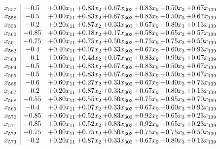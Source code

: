 \documentclass[8pt]{article}
\begin{document}
\[\begin{array}{c| c c@{\hskip 2pt} c@{\hskip 2pt} c@{\hskip 2pt} c@{\hskip 2pt} c@{\hskip 2pt} c@{\hskip 2pt} }
 x_{557}   &  -0.5 & +  0.00 x_{11} & +  0.83 x_{2} & +  0.67 x_{303} & +  0.83 x_{9} & +  0.50 x_{3} & +  0.67 x_{139}\\
 x_{558}   &  -0.5 & +  0.00 x_{11} & +  0.83 x_{2} & +  0.67 x_{303} & +  0.83 x_{9} & +  0.50 x_{3} & +  0.67 x_{139}\\
 x_{559}   &  -0.2 & +  0.20 x_{11} & +  0.87 x_{2} & +  0.33 x_{303} & +  0.67 x_{9} & +  0.80 x_{3} & +  0.13 x_{139}\\
 x_{560}   &  -0.85 & +  0.60 x_{11} & +  0.18 x_{2} & +  0.17 x_{303} & +  0.58 x_{9} & +  0.65 x_{3} & +  0.57 x_{139}\\
 x_{561}   &  -0.75 & +  0.00 x_{11} & +  0.75 x_{2} & +  0.50 x_{303} & +  0.75 x_{9} & +  0.75 x_{3} & +  0.50 x_{139}\\
 x_{562}   &  -0.4 & +  0.40 x_{11} & +  0.07 x_{2} & +  0.33 x_{303} & +  0.67 x_{9} & +  0.60 x_{3} & +  0.93 x_{139}\\
 x_{563}   &  -0.1 & +  0.60 x_{11} & +  0.43 x_{2} & +  0.67 x_{303} & +  0.83 x_{9} & +  0.90 x_{3} & +  0.07 x_{139}\\
 x_{564}   &  -0.5 & +  0.00 x_{11} & +  0.83 x_{2} & +  0.67 x_{303} & +  0.83 x_{9} & +  0.50 x_{3} & +  0.67 x_{139}\\
 x_{565}   &  -0.5 & +  0.00 x_{11} & +  0.83 x_{2} & +  0.67 x_{303} & +  0.83 x_{9} & +  0.50 x_{3} & +  0.67 x_{139}\\
 x_{566}   &  -0.6 & +  0.60 x_{11} & +  0.27 x_{2} & +  0.33 x_{303} & +  0.67 x_{9} & +  0.40 x_{3} & +  0.73 x_{139}\\
 x_{567}   &  -0.2 & +  0.20 x_{11} & +  0.87 x_{2} & +  0.33 x_{303} & +  0.67 x_{9} & +  0.80 x_{3} & +  0.13 x_{139}\\
 x_{568}   &  -0.55 & +  0.80 x_{11} & +  0.55 x_{2} & +  0.50 x_{303} & +  0.75 x_{9} & +  0.95 x_{3} & +  0.70 x_{139}\\
 x_{569}   &  -0.4 & +  0.40 x_{11} & +  0.07 x_{2} & +  0.33 x_{303} & +  0.67 x_{9} & +  0.60 x_{3} & +  0.93 x_{139}\\
 x_{570}   &  -0.85 & +  0.60 x_{11} & +  0.52 x_{2} & +  0.83 x_{303} & +  0.92 x_{9} & +  0.65 x_{3} & +  0.23 x_{139}\\
 x_{571}   &  -0.85 & +  0.60 x_{11} & +  0.52 x_{2} & +  0.83 x_{303} & +  0.92 x_{9} & +  0.65 x_{3} & +  0.23 x_{139}\\
 x_{572}   &  -0.75 & +  0.00 x_{11} & +  0.75 x_{2} & +  0.50 x_{303} & +  0.75 x_{9} & +  0.75 x_{3} & +  0.50 x_{139}\\
 x_{573}   &  -0.2 & +  0.20 x_{11} & +  0.87 x_{2} & +  0.33 x_{303} & +  0.67 x_{9} & +  0.80 x_{3} & +  0.13 x_{139}\\

\end{array}\]
\end{document}
